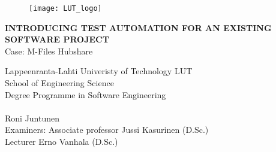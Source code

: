 \begin{flushleft}
	\begin{figure}
		\texttt{[image: LUT\_logo]}
		\label{fig:lut_logo}
	\end{figure}
\end{flushleft}

\doublespacing

\vspace{6cm}		
\textbf{INTRODUCING TEST AUTOMATION FOR AN EXISTING SOFTWARE PROJECT}\\
Case: M-Files Hubshare

{\flushleft\vfill{
	Lappeenranta-Lahti Univeristy of Technology LUT\\
	School of Engineering Science\\
	Degree Programme in Software Engineering\\
		
	\the\year{}\\
	Roni Juntunen\\
	Examiners: Associate professor Jussi Kasurinen (D.Sc.)\\
	\hspace{19.5mm} Lecturer Erno Vanhala (D.Sc.)\\
}}